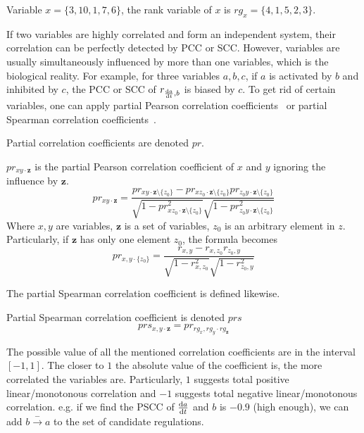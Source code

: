 \begin{example}
Variable $x=\{3,10,1,7,6\}$, the rank variable of $x$ is $rg_x=\{4,1,5,2,3\}$.
\end{example}


If two variables are highly correlated and form an independent system, their correlation can be perfectly detected by PCC or SCC.
However, variables are usually simultaneously influenced by more than one variables, which is the biological reality.
For example, for three variables $a,b,c$, if $a$ is activated by $b$ and inhibited by $c$, the PCC or SCC of $r_{\frac{{\rm d}a}{{\rm d}t},b}$ is biased by $c$. 
To get rid of certain variables, one can apply partial Pearson correlation coefficients~\cite{baba2004partial} or partial Spearman correlation coefficients~\cite{borror2001practical}.

Partial correlation coefficients are denoted $pr$.

\begin{definition}\label{def:PPCC}
    $pr_{xy\cdot \mathbf {z}}$ is the partial Pearson correlation coefficient of $x$ and $y$ ignoring the influence by $\mathbf {z}$.
    $$pr _{xy\cdot \mathbf {z} }={\frac {pr _{xy\cdot \mathbf {z} \setminus \{z_{0}\}}-pr _{xz_{0}\cdot \mathbf {z} \setminus \{z_{0}\}}pr _{z_{0}y\cdot \mathbf {z} \setminus \{z_{0}\}}}{{\sqrt {1-pr _{xz_{0}\cdot \mathbf {z} \setminus \{z_{0}\}}^{2}}}{\sqrt {1-pr _{z_{0}y\cdot \mathbf {z} \setminus \{z_{0}\}}^{2}}}}}$$
    Where $x,y$ are variables, $\mathbf {z}$ is a set of variables, $z_0$ is an arbitrary element in $z$. 
    Particularly, if $\mathbf {z}$ has only one element $z_0$, the formula becomes
    $$pr_{x,y\cdot \{z_0\}}={\frac {r _{x,y}-r _{x,z_0}r _{z_0,y}}{{\sqrt {1-r _{x,z_0}^{2}}}{\sqrt {1-r _{z_0,y}^{2}}}}}$$

\end{definition}

The partial Spearman correlation coefficient is defined likewise.
\begin{definition}\label{def:PSCC}
Partial Spearman correlation coefficient is denoted $prs$
    $$prs_{x,y\cdot \mathbf {z}}=pr_{rg_x,rg_y\cdot rg_\mathbf {z}}$$%
\end{definition}

The possible value of all the mentioned correlation coefficients are in the interval $[-1,1]$.
The closer to $1$ the absolute value of the coefficient is, the more correlated the variables are.
Particularly, $1$ suggests total positive linear/monotonous correlation and $-1$ suggests total negative linear/monotonous correlation. 
e.g. if we find the PSCC of $\frac{{\rm d}a}{{\rm d}t}$ and $b$ is $-0.9$ (high enough), we can add $b\xrightarrow{-}a$ to the set of candidate regulations.

